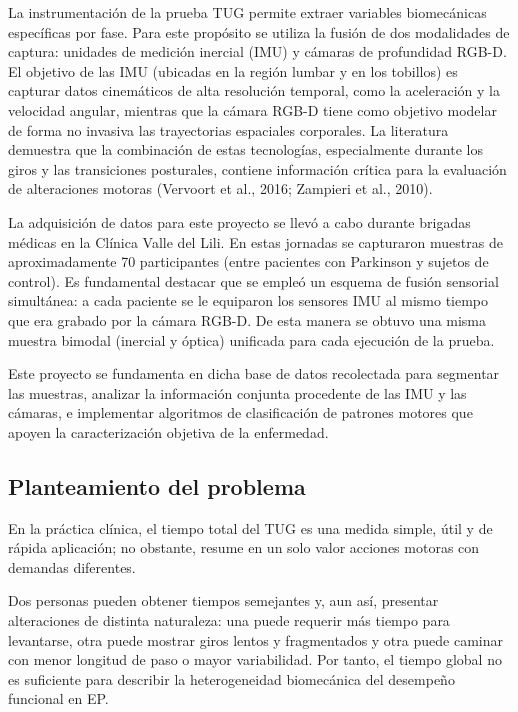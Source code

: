 \documentclass[12pt,a4paper]{article}
\begin{document}
La instrumentación de la prueba TUG permite extraer variables biomecánicas específicas por fase. Para este propósito se utiliza la fusión de dos modalidades de captura: unidades de medición inercial (IMU) y cámaras de profundidad RGB-D. El objetivo de las IMU (ubicadas en la región lumbar y en los tobillos) es capturar datos cinemáticos de alta resolución temporal, como la aceleración y la velocidad angular, mientras que la cámara RGB-D tiene como objetivo modelar de forma no invasiva las trayectorias espaciales corporales. La literatura demuestra que la combinación de estas tecnologías, especialmente durante los giros y las transiciones posturales, contiene información crítica para la evaluación de alteraciones motoras (Vervoort et al., 2016; Zampieri et al., 2010).

La adquisición de datos para este proyecto se llevó a cabo durante brigadas médicas en la Clínica Valle del Lili. En estas jornadas se capturaron muestras de aproximadamente 70 participantes (entre pacientes con Parkinson y sujetos de control). Es fundamental destacar que se empleó un esquema de fusión sensorial simultánea: a cada paciente se le equiparon los sensores IMU al mismo tiempo que era grabado por la cámara RGB-D. De esta manera se obtuvo una misma muestra bimodal (inercial y óptica) unificada para cada ejecución de la prueba.

Este proyecto se fundamenta en dicha base de datos recolectada para segmentar las muestras, analizar la información conjunta procedente de las IMU y las cámaras, e implementar algoritmos de clasificación de patrones motores que apoyen la caracterización objetiva de la enfermedad.

\subsection{Planteamiento del problema}\label{sec:problema}

En la práctica clínica, el tiempo total del TUG es una medida simple, útil y de rápida aplicación; no obstante, resume en un solo valor acciones motoras con demandas diferentes.

Dos personas pueden obtener tiempos semejantes y, aun así, presentar alteraciones de distinta naturaleza: una puede requerir más tiempo para levantarse, otra puede mostrar giros lentos y fragmentados y otra puede caminar con menor longitud de paso o mayor variabilidad. Por tanto, el tiempo global no es suficiente para describir la heterogeneidad biomecánica del desempeño funcional en EP.
\end{document}
